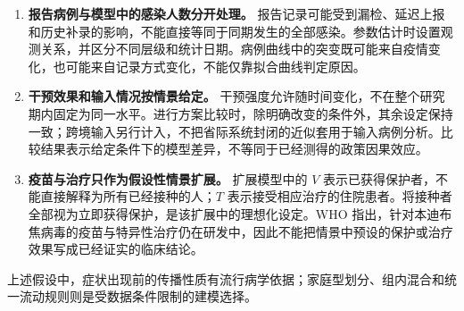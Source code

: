 \begin{enumerate}[label=\textbf{A\arabic*.},leftmargin=2.6em,itemsep=0.6em]
\item \textbf{报告病例与模型中的感染人数分开处理。}
报告记录可能受到漏检、延迟上报和历史补录的影响，不能直接等同于同期发生的全部感染。参数估计时设置观测关系，并区分不同层级和统计日期。病例曲线中的突变既可能来自疫情变化，也可能来自记录方式变化，不能仅靠拟合曲线判定原因。

\item \textbf{干预效果和输入情况按情景给定。}
干预强度允许随时间变化，不在整个研究期内固定为同一水平。进行方案比较时，除明确改变的条件外，其余设定保持一致；跨境输入另行计入，不把省际系统封闭的近似套用于输入病例分析。比较结果表示给定条件下的模型差异，不等同于已经测得的政策因果效应。

\item \textbf{疫苗与治疗只作为假设性情景扩展。}
扩展模型中的 $V$ 表示已获得保护者，不能直接解释为所有已经接种的人；$T$ 表示接受相应治疗的住院患者。将接种者全部视为立即获得保护，是该扩展中的理想化设定。WHO 指出，针对本迪布焦病毒的疫苗与特异性治疗仍在研发中\cite{whofactsheet}，因此不能把情景中预设的保护或治疗效果写成已经证实的临床结论。

\end{enumerate}

上述假设中，症状出现前的传播性质有流行病学依据；家庭型划分、组内混合和统一流动规则则是受数据条件限制的建模选择。

